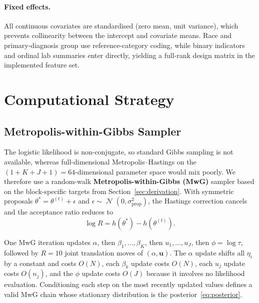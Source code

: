 \documentclass[10pt]{article}
\newcommand{\bu}{\bm{u}}
\DeclareMathOperator{\Normal}{\mathcal{N}}
\begin{document}
\paragraph{Fixed effects.}
All continuous covariates are standardised (zero mean, unit variance),
which prevents collinearity between the intercept and covariate means.
Race and primary-diagnosis group use reference-category coding, while binary
indicators and ordinal lab summaries enter directly, yielding a full-rank
design matrix in the implemented feature set.

\section{Computational Strategy}
\label{sec:computation}

\subsection{Metropolis-within-Gibbs Sampler}

The logistic likelihood is non-conjugate, so standard Gibbs sampling is not
available, whereas full-dimensional Metropolis--Hastings on the
$(1 + K + J + 1) = 64$-dimensional parameter space would mix poorly. We
therefore use a random-walk \textbf{Metropolis-within-Gibbs (MwG)} sampler
based on the block-specific targets from Section~\ref{sec:derivation}. With
symmetric proposals $\theta^* = \theta^{(t)} + \epsilon$ and
$\epsilon \sim \Normal(0, \sigma_{\text{prop}}^2)$, the Hastings correction
cancels and the acceptance ratio reduces to
\begin{equation}\label{eq:log-ratio}
  \log R = h(\theta^*) - h(\theta^{(t)}).
\end{equation}

One MwG iteration updates $\alpha$, then $\beta_1,\dots,\beta_K$, then
$u_1,\dots,u_J$, then $\phi = \log\tau$, followed by $R = 10$ joint
translation moves of $(\alpha,\bu)$. The $\alpha$ update shifts all
$\eta_i$ by a constant and costs $O(N)$, each $\beta_k$ update costs $O(N)$,
each $u_j$ update costs $O(n_j)$, and the $\phi$ update costs $O(J)$ because
it involves no likelihood evaluation. Conditioning each step on the most
recently updated values defines a valid MwG chain whose stationary
distribution is the posterior~\eqref{eq:posterior}.
\end{document}
